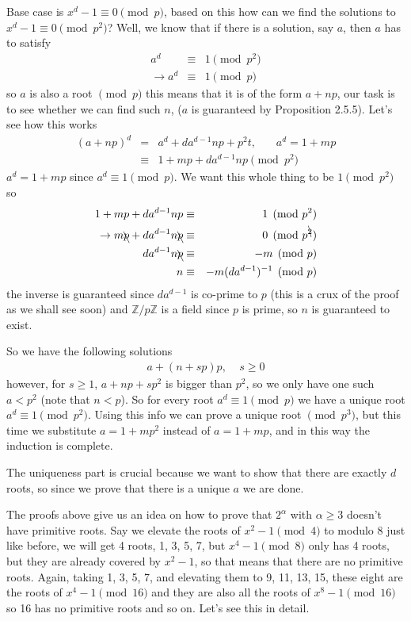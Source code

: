 \documentclass[aps,preprint,preprintnumbers,nofootinbib,showpacs,prd]{revtex4-1}
\newcommand{\nbea}{\begin{eqnarray*}}
\newcommand{\neea}{\end{eqnarray*}}
\begin{document}
Base case is $x^d - 1\equiv 0 \pmod{p}$, based on this how can we find the solutions to $x^d - 1\equiv 0 \pmod{p^2}$? Well, we know that if there is a solution, say $a$, then $a$ has to satisfy
%
\nbea
a^d & \equiv & 1 \pmod{p^2} \\
\to a^d & \equiv & 1 \pmod{p}
\neea
%
so $a$ is also a root $\pmod{p}$ this means that it is of the form $a + np$, our task is to see whether we can find such $n$, ($a$ is guaranteed by Proposition 2.5.5). Let's see how this works
%
\nbea
(a + np)^d & = & a^d + da^{d-1}np + p^2 t, ~~~~~~~~ a^d = 1 + mp \\
& \equiv & 1 + mp + da^{d-1}np \pmod{p^2}
\neea
%
$a^d = 1 + mp$ since $a^d \equiv 1 \pmod{p}$. We want this whole thing to be $1 \pmod{p^2}$ so
%
\nbea
1 + mp + da^{d-1}np & \equiv & 1 \pmod{p^2} \\
\to m\bcancel{p} + da^{d-1}n\bcancel{p} & \equiv & 0 \pmod{p^{\bcancel{2}}} \\
da^{d-1}n\bcancel{p} & \equiv & -m \pmod{p} \\
n & \equiv & -m(da^{d-1})^{-1} \pmod{p}
\neea
%
the inverse is guaranteed since $da^{d-1}$ is co-prime to $p$ (this is a crux of the proof as we shall see soon) and $\mathbb{Z}/p\mathbb{Z}$ is a field since $p$ is prime, so $n$ is guaranteed to exist.

So we have the following solutions 
%
\nbea
a + (n + sp)p, ~~~~~ s \ge 0
\neea
%
however, for $s \ge 1$, $a + np + sp^2$ is bigger than $p^2$, so we only have one such $a < p^2$ (note that $n < p$). So for every root $a^d \equiv 1 \pmod{p}$ we have a unique root $a^d \equiv 1 \pmod{p^2}$. Using this info we can prove a unique root $\pmod{p^3}$, but this time we substitute $a = 1 +mp^2$ instead of $a = 1 + mp$, and in this way the induction is complete.

The uniqueness part is crucial because we want to show that there are exactly $d$ roots, so since we prove that there is a unique $a$ we are done.

The proofs above give us an idea on how to prove that $2^\alpha$ with $\alpha \ge 3$ doesn't have primitive roots. Say we elevate the roots of $x^2 - 1 \pmod{4}$ to modulo 8 just like before, we will get 4 roots, 1, 3, 5, 7, but $x^4 - 1 \pmod{8}$ only has 4 roots, but they are already covered by $x^2 - 1$, so that means that there are no primitive roots. Again, taking 1, 3, 5, 7, and elevating them to 9, 11, 13, 15, these eight are the roots of $x^4 - 1 \pmod{16}$ and they are also all the roots of $x^8 - 1\pmod{16}$ so 16 has no primitive roots and so on. Let's see this in detail. 
\end{document}
